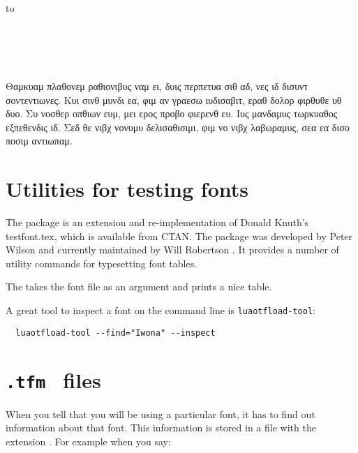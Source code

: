 \bgroup
{}
\begin{minipage}[t]{.2\linewidth}
\hbox to 
\end{minipage}
\begin{minipage}[t]{.65\linewidth}
^^A
\noindent\fox\\
\alphabet\\
\textsc{\alphabet}\\
\punctuation\\
\frogking
Θαμκυαμ πλαθονεμ ραθιονιβυς ναμ ει, δυις περπετυα σιθ αδ, νες ιδ δισυντ σοντεντιωνες. Κυι σινθ μυνδι εα, φιμ αν γραεσω ιυδισαβιτ, εραθ δολορ φιρθυθε υθ δυο. Συ νοσθερ οπθιων ευμ, μει ερος προβο φιερενθ ευ. Ιυς μανδαμυς τωρκυαθος εξπεθενδις ιδ. Σεδ θε νιβχ νονυμυ δελισαθισιμι, φιμ νο νιβχ λαβωραμυς, σεα εα δισο ποσιμ αντιωπαμ.
\end{minipage}
\egroup

\section{Utilities for testing fonts}

The package  is an extension and re-implementation of Donald Knuth’s testfont.tex, which
is available from CTAN. The package was developed by Peter Wilson and currently maintained by Will Robertson \citep{fonttable}. It provides a number of utility commands for typesetting font tables.

\begin{macro}{\fonttable}
The  takes the font file as an  argument and prints a nice table. 
\end{macro}
 
\ifxetex
 \else
\fi

A great tool to inspect a font on the command line is \texttt{luaotfload-tool}:

\begin{verbatim}
  luaotfload-tool --find="Iwona" --inspect
\end{verbatim}

\section{ \texttt{.tfm } files}


When you tell \tex that you will be using a particular font, it has to find out information about that font. This information is stored in a file with the extension . For example when you say:

